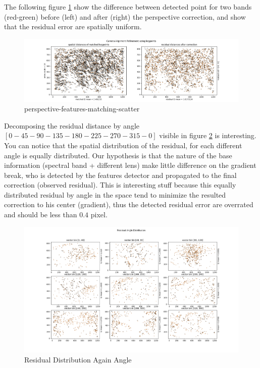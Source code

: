 \documentclass[]{elsarticle}
\begin{document}
			The following figure \ref{fig:perspective-features-matching-scatter} show the difference between detected point for two bands (red-green)
			before (left) and after (right) the perspective correction, and show that the residual error are spatially uniform.
			
			\begin{figure}[!htb]
				\centering
				\includegraphics[width=\linewidth]{../figures/perspective-features-matching-scatter.png}
				\caption{perspective-features-matching-scatter}
				\label{fig:perspective-features-matching-scatter}
			\end{figure}
		
			Decomposing the residual distance by angle $[0-45-90-135-180-225-270-315-0]$ visible in figure \ref{fig:residual-angle} is interesting.
			You can notice that the spatial distribution of the residual, for each different angle is equally distributed.
			Our hypothesis is that the nature of the base information (spectral band + different lens) make little difference on the gradient break,
			who is detected by the features detector and propagated to the final correction (observed residual).
			This is interesting stuff because this equally distributed residual by angle in the space tend to minimize the resulted correction to his center (gradient),
			thus the detected residual error are overrated and should be less than $0.4$ pixel.
			
			\begin{figure}[!htb]
				\centering
				\includegraphics[width=\linewidth]{../figures/perspective-features-residual.png}
				\caption{Residual Distribution Again Angle}
				\label{fig:residual-angle}
			\end{figure}
			
\end{document}

